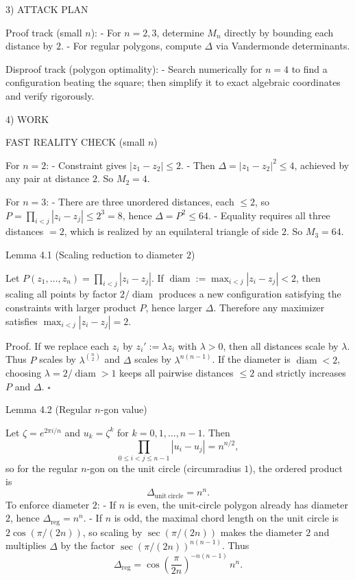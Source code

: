 3) ATTACK PLAN

Proof track (small $n$):
- For $n=2,3$, determine $M_n$ directly by bounding each distance by $2$.
- For regular polygons, compute $\Delta$ via Vandermonde determinants.

Disproof track (polygon optimality):
- Search numerically for $n=4$ to find a configuration beating the square; then simplify it to exact
  algebraic coordinates and verify rigorously.

4) WORK

FAST REALITY CHECK (small $n$)

For $n=2$:
- Constraint gives $|z_1-z_2|\le 2$.
- Then $\Delta=|z_1-z_2|^2\le 4$, achieved by any pair at distance $2$.
So $M_2=4$.

For $n=3$:
- There are three unordered distances, each $\le 2$, so
  $P=\prod_{i<j}|z_i-z_j|\le 2^3=8$, hence $\Delta=P^2\le 64$.
- Equality requires all three distances $=2$, which is realized by an equilateral triangle of side $2$.
So $M_3=64$.

Lemma 4.1 (Scaling reduction to diameter $2$)

Let $P(z_1,\dots,z_n)=\prod_{i<j}|z_i-z_j|$.
If $\operatorname{diam}:=\max_{i<j}|z_i-z_j|<2$, then scaling all points by factor $2/\operatorname{diam}$
produces a new configuration satisfying the constraints with larger product $P$, hence larger $\Delta$.
Therefore any maximizer satisfies $\max_{i<j}|z_i-z_j|=2$.

Proof.
If we replace each $z_i$ by $z_i' := \lambda z_i$ with $\lambda>0$, then all distances scale by $\lambda$.
Thus $P$ scales by $\lambda^{\binom{n}{2}}$ and $\Delta$ scales by $\lambda^{n(n-1)}$.
If the diameter is $\operatorname{diam}<2$, choosing $\lambda=2/\operatorname{diam}>1$ keeps all pairwise
 distances $\le 2$ and strictly increases $P$ and $\Delta$.
$\square$

Lemma 4.2 (Regular $n$-gon value)

Let $\zeta= e^{2\pi i/n}$ and $u_k=\zeta^k$ for $k=0,1,\dots,n-1$.
Then
\[
  \prod_{0\le i<j\le n-1} |u_i-u_j| = n^{n/2},
\]
so for the regular $n$-gon on the unit circle (circumradius $1$), the ordered product is
\[
  \Delta_{\mathrm{unit\ circle}} = n^n.
\]
To enforce diameter $2$:
- If $n$ is even, the unit-circle polygon already has diameter $2$, hence $\Delta_{\mathrm{reg}}=n^n$.
- If $n$ is odd, the maximal chord length on the unit circle is $2\cos(\pi/(2n))$, so scaling by
  $\sec(\pi/(2n))$ makes the diameter $2$ and multiplies $\Delta$ by the factor
  $\sec(\pi/(2n))^{n(n-1)}$. Thus
\[
  \Delta_{\mathrm{reg}} = \cos\!\left(\frac{\pi}{2n}\right)^{-n(n-1)}\,n^n.
\]

